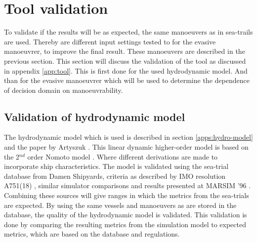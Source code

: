 \section{Tool validation}
\label{sec:manoeuvrer-results}
To validate if the results will be as expected, the same manoeuvers as in sea-trails are used. Thereby are different input settings tested to for the evasive manoeuvrer, to improve the final result. These manoeuvers are described in the previous section. This section will discuss the validation of the tool as discussed in appendix \ref{app:tool}. This is first done for the used hydrodynamic model. And than for the evasive manoeuvrer which will be used to determine the dependence of decision domain on manoeuvrability. 

\subsection{Validation of hydrodynamic model}
The hydrodynamic model which is used is described in section \ref{apps:hydro-model} and the paper by Artyszuk \cite{Artyszuk2016}. This linear dynamic higher-order model is based on the 2$^{nd}$ order Nomoto model \cite{Nomoto1957}. Where different derivations are made to incorporate ship characteristics. 
The model is validated using the sea-trial database from Damen Shipyards, criteria as described by IMO resolution A751(18) \cite{Quadvlieg2003}, similar simulator comparisons \cite{Tjoswold2012} and results presented at MARSIM '96 \cite{MARSIM1996}. Combining these sources will give ranges in which the metrics from the sea-trials are expected. By using the same vessels and manoeuvers as are stored in the database, the quality of the hydrodynamic model is validated. This validation is done by comparing the resulting metrics from the simulation model to expected metrics, which are based on the database and regulations. 

